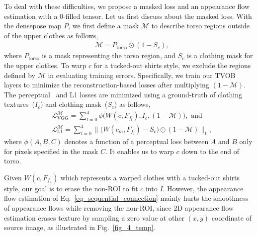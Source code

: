 \documentclass[letterpaper]{article} %
\begin{document}
To deal with these difficulties, we propose a masked loss and an appearance flow estimation with a 0-filled tensor.
Let us first discuss about the masked loss. 
With the densepose map $P$, we first define a mask $\mathcal{M}$ to describe torso regions outside of the upper clothes as follows,
\begin{eqnarray}
    & \mathcal{M} = P_{\text{torso}} \odot (1-S_c),
\end{eqnarray}
where $P_{\text{torso}}$ is a mask representing the torso region, and $S_c$ is a clothing mask for the upper clothes.
To warp $c$ for a tucked-out shirts style, we exclude the regions defined by $\mathcal{M}$ in evaluating training errors. 
Specifically, we train our TVOB layers to minimize the reconstruction-based losses after multiplying $(1-\mathcal{M})$.
The perceptual~\cite{johnson2016perceptual} and L1 losses are minimized using a ground-truth of clothing textures~($I_c$) and clothing mask~($S_c$) as follows,
\begin{eqnarray}
    & \mathcal{L}_{\text{VGG}}^{\mathcal{M}} = \sum\limits_{l=0}^{4}\phi \big( W(c, F_{f_l}) , I_c, (1-\mathcal{M}) \big), \text{ and} \\ 
    & \mathcal{L}_{\text{L1}}^{\mathcal{M}} = \sum\limits_{l=0}^{4}\| \big( W(c_m, F_{f_l}) - S_c \big) \odot (1-\mathcal{M}) \|_1,
\end{eqnarray}
where $\phi(A,B,C)$ denotes a function of a perceptual loss between $A$ and $B$ only for pixels specified in the mask $C$. 
It enables us to warp $c$ down to the end of torso.

Given $W(c,F_{f_4})$ which represents a warped clothes with a tucked-out shirts style, our goal is to erase the non-ROI to fit $c$ into $I$.
However, the appearance flow estimation of Eq.~\ref{eq_sequential_connection} mainly hurts the smoothness of appearance flows while removing the non-ROI, since 2D appearance flow estimation erases texture by sampling a zero value at other $(x,y)$ coordinate of source image, as illustrated in Fig.~\ref{fig_4_temp}.
\end{document}

